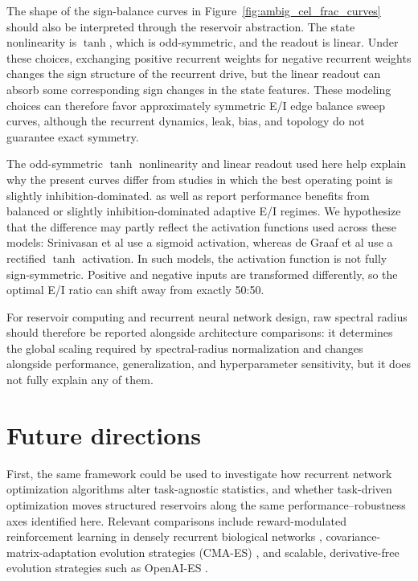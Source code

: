 \documentclass[a4paper,fleqn]{style_neural_networks/cas-dc}
\let\parencite\citep
\begin{document}
The shape of the sign-balance curves in Figure~\ref{fig:ambig_cel_frac_curves} should also be interpreted through the reservoir abstraction. The state nonlinearity is \(\tanh\), which is odd-symmetric, and the readout is linear. Under these choices, exchanging positive recurrent weights for negative recurrent weights changes the sign structure of the recurrent drive, but the linear readout can absorb some corresponding sign changes in the state features. These modeling choices can therefore favor approximately symmetric E/I edge balance sweep curves, although the recurrent dynamics, leak, bias, and topology do not guarantee exact symmetry.

The odd-symmetric \(\tanh\) nonlinearity and linear readout used here help explain why the present curves differ from studies in which the best operating point is slightly inhibition-dominated. \cite{srinivasan_ei_balance_2025} as well as \cite{de_graaf_spinal_inhibition_2025} report performance benefits from balanced or slightly inhibition-dominated adaptive E/I regimes. We hypothesize that the difference may partly reflect the activation functions used across these models: Srinivasan et al use a sigmoid activation, whereas de Graaf et al use a rectified \(\tanh\) activation. In such models, the activation function is not fully sign-symmetric. Positive and negative inputs are transformed differently, so the optimal E/I ratio can shift away from exactly 50:50.


For reservoir computing and recurrent neural network design, raw spectral radius should therefore be reported alongside architecture comparisons: it determines the global scaling required by spectral-radius normalization and changes alongside performance, generalization, and hyperparameter sensitivity, but it does not fully explain any of them. 

\section{Future directions}
First, the same framework could be used to investigate how recurrent network optimization algorithms alter task-agnostic statistics, and whether task-driven optimization moves structured reservoirs along the same performance--robustness axes identified here. Relevant comparisons include reward-modulated reinforcement learning in densely recurrent biological networks \parencite{churchland_garcia-ojalvo_2026}, covariance-matrix-adaptation evolution strategies (CMA-ES) \parencite{hansen_cmaes_2016}, and scalable, derivative-free evolution strategies such as OpenAI-ES \parencite{salimans_evolution_2017}.
\end{document}
